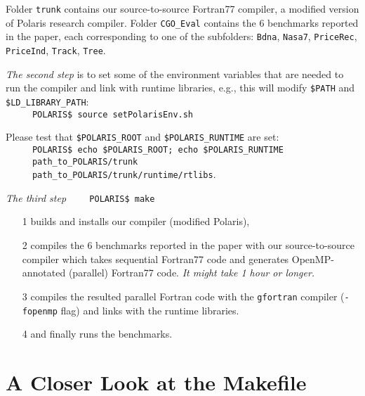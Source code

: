 \documentclass{sig-alternate}
\begin{document}
Folder {\tt trunk} contains our source-to-source Fortran77 compiler,
a modified version of Polaris research compiler.
Folder {\tt CGO\_Eval} contains the 6 benchmarks reported in the paper,
    each corresponding to one of the subfolders: {\tt Bdna}, {\tt Nasa7},
    {\tt PriceRec}, {\tt PriceInd}, {\tt Track}, {\tt Tree}.

{\em The second step} is to set some of the environment variables
that are needed to run the compiler and link with runtime 
libraries, e.g., this will modify {\tt \$PATH} and {\tt \$LD\_LIBRARY\_PATH}:\\
$\mbox{ }${\tt~~~~POLARIS\$ source setPolarisEnv.sh}\vspace{1ex}

Please test that {\tt \$POLARIS\_ROOT} and {\tt \$POLARIS\_RUNTIME} are set:\\
$\mbox{ }${\tt~~~~POLARIS\$ echo \$POLARIS\_ROOT; echo \$POLARIS\_RUNTIME}\\
$\mbox{ }${\tt~~~~path\_to\_POLARIS/trunk}\\
$\mbox{ }${\tt~~~~path\_to\_POLARIS/trunk/runtime/rtlibs}.\vspace{2ex}

{\em The third step} {\tt~~~~POLARIS\$ make}
\begin{itemize}
    \item[1]  builds and installs our compiler (modified Polaris), 
    \item[2]  compiles the $6$ benchmarks reported in the paper with
             our source-to-source compiler 
             which takes sequential Fortran77 code and generates 
             OpenMP-annotated (parallel) Fortran77 code.
             {\em It might take 1 hour or longer.}
    \item[3] compiles the resulted parallel Fortran code
              with the {\tt gfortran} compiler ({\tt -fopenmp} flag) 
                and links with the runtime libraries.
    \item[4] and finally runs the benchmarks.
\end{itemize}

\section{A Closer Look at the Makefile}
\end{document}
